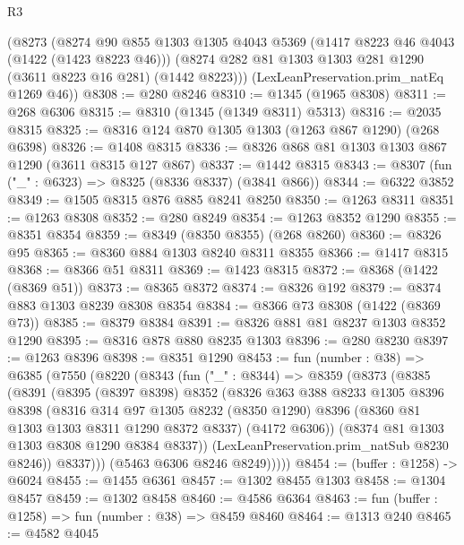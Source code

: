 \begin{lexlean}{R3}
\begin{coremodule}
    (@8273
      (@8274
        @90
        @855
        @1303
        @1305
        @4043
        @5369
        (@1417 @8223 @46 @4043 (@1422 (@1423 @8223 @46)))
        (@8274 @282 @81 @1303 @1303 @281 @1290 (@3611 @8223 @16 @281) (@1442 @8223)))
      (LexLeanPreservation.prim_natEq @1269 @46))
@8308 := @280 @8246
@8310 := @1345 (@1965 @8308)
@8311 := @268 @6306
@8315 := @8310 (@1345 (@1349 @8311) @5313)
@8316 := @2035 @8315
@8325 := @8316 @124 @870 @1305 @1303 (@1263 @867 @1290) (@268 @6398)
@8326 := @1408 @8315
@8336 := @8326 @868 @81 @1303 @1303 @867 @1290 (@3611 @8315 @127 @867)
@8337 := @1442 @8315
@8343 := @8307 (fun ("_" : @6323) => @8325 (@8336 @8337) (@3841 @866))
@8344 := @6322 @3852
@8349 := @1505 @8315 @876 @885 @8241 @8250
@8350 := @1263 @8311
@8351 := @1263 @8308
@8352 := @280 @8249
@8354 := @1263 @8352 @1290
@8355 := @8351 @8354
@8359 := @8349 (@8350 @8355) (@268 @8260)
@8360 := @8326 @95
@8365 := @8360 @884 @1303 @8240 @8311 @8355
@8366 := @1417 @8315
@8368 := @8366 @51 @8311
@8369 := @1423 @8315
@8372 := @8368 (@1422 (@8369 @51))
@8373 := @8365 @8372
@8374 := @8326 @192
@8379 := @8374 @883 @1303 @8239 @8308 @8354
@8384 := @8366 @73 @8308 (@1422 (@8369 @73))
@8385 := @8379 @8384
@8391 := @8326 @881 @81 @8237 @1303 @8352 @1290
@8395 := @8316 @878 @880 @8235 @1303
@8396 := @280 @8230
@8397 := @1263 @8396
@8398 := @8351 @1290
@8453 := fun (number : @38) =>
  @6385
    (@7550
      (@8220
        (@8343
          (fun ("_" : @8344) =>
          @8359
            (@8373
              (@8385
                (@8391
                  (@8395
                    (@8397 @8398)
                    @8352
                    (@8326
                      @363
                      @388
                      @8233
                      @1305
                      @8396
                      @8398
                      (@8316
                        @314
                        @97
                        @1305
                        @8232
                        (@8350 @1290)
                        @8396
                        (@8360 @81 @1303 @1303 @8311 @1290 @8372 @8337)
                        (@4172 @6306))
                      (@8374 @81 @1303 @1303 @8308 @1290 @8384 @8337))
                    (LexLeanPreservation.prim_natSub @8230 @8246))
                  @8337)))
            (@5463 @6306 @8246 @8249)))))
@8454 := (buffer : @1258) -> @6024
@8455 := @1455 @6361
@8457 := @1302 @8455 @1303
@8458 := @1304 @8457
@8459 := @1302 @8458
@8460 := @4586 @6364
@8463 := fun (buffer : @1258) => fun (number : @38) => @8459 @8460
@8464 := @1313 @240
@8465 := @4582 @4045

\end{coremodule}
\end{lexlean}
